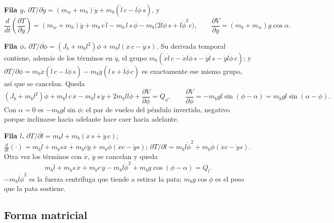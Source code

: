 \documentclass[11pt,a4paper]{article}
\newcommand{\dt}[1]{\frac{d}{dt}\!\left(#1\right)}
\begin{document}
\textbf{Fila $y$.} $\partial T/\partial\dot y = (m_w+m_b)\dot y + m_b(\dot l\,c - l\dot\phi\,s)$, y
\begin{equation}
  \dt{\frac{\partial T}{\partial\dot y}} = (m_w+m_b)\ddot y + m_b\,c\,\ddot l - m_b\,l\,s\,\ddot\phi
  - m_b\big(2\dot l\dot\phi\,s + l\dot\phi^2 c\big), \qquad \frac{\partial V}{\partial y} = (m_b+m_w)g\cos\alpha .
\end{equation}

\textbf{Fila $\phi$.} $\partial T/\partial\dot\phi = (J_b + m_b l^2)\dot\phi + m_b l(\dot x\,c - \dot y\,s)$.
Su derivada temporal contiene, además de los términos en $\ddot q$, el grupo
$m_b(\dot x\dot l\,c - \dot x l\dot\phi\,s - \dot y\dot l\,s - \dot y l\dot\phi\,c)$; y
$\partial T/\partial\phi = m_b\dot x(\dot l\,c - l\dot\phi\,s) - m_b\dot y(\dot l\,s + l\dot\phi\,c)$ es exactamente
ese mismo grupo, así que se cancelan. Queda
\begin{equation}
  (J_b + m_b l^2)\ddot\phi + m_b l\,c\,\ddot x - m_b l\,s\,\ddot y + 2 m_b l\dot l\dot\phi
  + \frac{\partial V}{\partial\phi} = Q_\phi, \qquad \frac{\partial V}{\partial\phi} = -m_b g l\sin(\phi-\alpha) = m_b g l\sin(\alpha-\phi).
\end{equation}
Con $\alpha = 0$ es $-m_b g l\sin\phi$: el par de vuelco del péndulo invertido, negativo porque inclinarse
hacia adelante hace caer hacia adelante.

\textbf{Fila $l$.} $\partial T/\partial\dot l = m_b\dot l + m_b(\dot x\,s + \dot y\,c)$;
$\dt{\cdot} = m_b\ddot l + m_b s\ddot x + m_b c\ddot y + m_b\dot\phi(\dot x c - \dot y s)$;
$\partial T/\partial l = m_b l\dot\phi^2 + m_b\dot\phi(\dot x c - \dot y s)$. Otra vez los términos con
$\dot x$, $\dot y$ se cancelan y queda
\begin{equation}
  m_b\ddot l + m_b s\,\ddot x + m_b c\,\ddot y - m_b l\dot\phi^2 + m_b g\cos(\phi - \alpha) = Q_l .
\end{equation}
$-m_b l\dot\phi^2$ es la fuerza centrífuga que tiende a estirar la pata; $m_b g\cos\phi$ es el peso que la
pata sostiene.

\subsection{Forma matricial}
\end{document}
